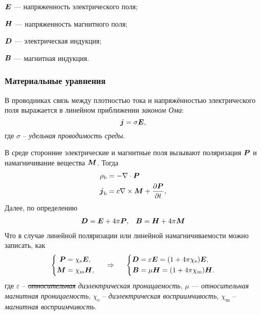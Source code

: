 \begin{description*}
    \item[$\mbox{\boldmath $E$}$]  --- напряженность электрического поля;
    \item[$\mbox{\boldmath $H$}$]  --- напряженность магнитного поля;
    \item[$\mbox{\boldmath $D$}$]  --- электрическая индукция;
    \item[$\mbox{\boldmath $B$}$]  --- магнитная индукция.
\end{description*}

\subsubsection*{Материальные уравнения}

В проводниках связь между плотностью тока и напряжённостью электрического поля выражается в линейном приближении \textit{законом Ома}:
\begin{equation*}
    \mbox{\boldmath $j$} = \sigma \mbox{\boldmath $E$},
\end{equation*}
где $\sigma$ -- \textit{удельная проводимость среды}.

В среде сторонние электрические и магнитные поля вызывают поляризация $\mbox{\boldmath $P$}$ и намагничивание вещества $\mbox{\boldmath $M$}$.
Тогда
\begin{align*}
    \rho_\text{b} &= - \nabla \cdot \mbox{\boldmath $P$} \\
    \mbox{\boldmath $j$}_\text{b} &= c \nabla \times \mbox{\boldmath $M$} + \frac{\partial \mbox{\boldmath $P$}}{\partial t} ,
\end{align*}
Далее, по определению
\begin{align*}
    \mbox{\boldmath $D$} &= \mbox{\boldmath $E$} + 4\pi \mbox{\boldmath $P$}, &\mbox{\boldmath $B$} &= \mbox{\boldmath $H$} + 4 \pi \mbox{\boldmath $M$} \\
\end{align*}
Что в случае линейной поляризации или линейной намагничиваемости можно записать, как  
$$
    \left\{\begin{aligned}
        \mbox{\boldmath $P$} &= \chi_{\text{e}} \mbox{\boldmath $E$}, \\
        \mbox{\boldmath $M$} &= \chi_{\text{m}} \mbox{\boldmath $H$}, \\
    \end{aligned}\right.
    \hspace{0.5cm} \Rightarrow \hspace{0.5cm} 
    \left\{\begin{aligned}
         \mbox{\boldmath $D$} &= \varepsilon \mbox{\boldmath $E$} = (1 + 4\pi \chi_{\text{e}}) \mbox{\boldmath $E$}, \\
       \mbox{\boldmath $B$} &= \mu \mbox{\boldmath $H$} = (1 + 4 \pi \chi_{\text{m}}) \mbox{\boldmath $H$}.
    \end{aligned}\right.
$$
где $\varepsilon$ -- \textit{\sout{относительная} диэлектрическая проницаемость}, $\mu$  — \textit{относительная магнитная проницаемость}, $\chi_{\text{e}}$  -- \textit{диэлектрическая восприимчивость}, $\chi_{\text{m}}$ -- \textit{магнитная восприимчивость}.

